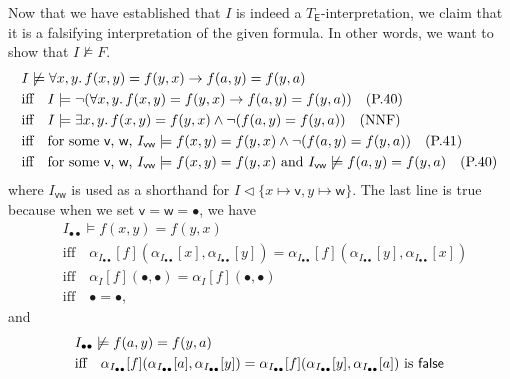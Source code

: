 \begin{exer}[3.1]
\begin{enumerate}[label=(\alph*)]
            Now that we have established that $I$ is indeed a $T_{\textsf{E}}$-interpretation, we claim that it is a falsifying interpretation of the given formula.
            In other words, we want to show that $I \not\models F$.
            \begin{align*}
                &I \not\models \forall x, y.\, f(x, y) = f(y, x) \rightarrow f(a, y) = f(y, a) \\
                &\text{iff}\quad I \models \neg(\forall x, y.\, f(x, y) = f(y, x) \rightarrow f(a, y) = f(y, a)) \quad\text{(P.40)} \\
                &\text{iff}\quad I \models \exists x, y.\, f(x, y) = f(y, x) \land \neg(f(a, y) = f(y, a)) \quad\text{(NNF)} \\
                &\text{iff}\quad \text{for some \textsf{v}, \textsf{w}, } I_{\textsf{vw}} \models f(x, y) = f(y, x) \land \neg(f(a, y) = f(y, a)) \quad\text{(P.41)} \\
                &\text{iff}\quad \text{for some \textsf{v}, \textsf{w}, } I_{\textsf{vw}} \models f(x, y) = f(y, x) \text{ and } I_{\textsf{vw}} \not\models f(a, y) = f(y, a) \quad\text{(P.40)}
            \end{align*}
            where $I_{\textsf{vw}}$ is used as a shorthand for $I \vartriangleleft \{ x \mapsto \textsf{v}, y \mapsto \textsf{w} \}$.
            The last line is true because when we set $\textsf{v} = \textsf{w} = \bullet$, we have
            \begin{align*}
                & I_{\bullet\bullet} \models f(x, y) = f(y, x) \\
                &\text{iff}\quad \alpha_{I_{\bullet\bullet}}[f](\alpha_{I_{\bullet\bullet}}[x], \alpha_{I_{\bullet\bullet}}[y]) = \alpha_{I_{\bullet\bullet}}[f](\alpha_{I_{\bullet\bullet}}[y], \alpha_{I_{\bullet\bullet}}[x]) \\
                &\text{iff}\quad \alpha_{I}[f](\bullet, \bullet) = \alpha_{I}[f](\bullet, \bullet) \\
                &\text{iff}\quad \bullet = \bullet,
            \end{align*}
            and
            \begin{align*}
                & I_{\bullet\bullet} \not\models f(a, y) = f(y, a) \\
                &\text{iff}\quad \alpha_{I_{\bullet\bullet}}[f](\alpha_{I_{\bullet\bullet}}[a], \alpha_{I_{\bullet\bullet}}[y]) = \alpha_{I_{\bullet\bullet}}[f](\alpha_{I_{\bullet\bullet}}[y], \alpha_{I_{\bullet\bullet}}[a]) \text{ is \textsf{false}}\\

\end{align*}
\end{enumerate}
\end{exer}
